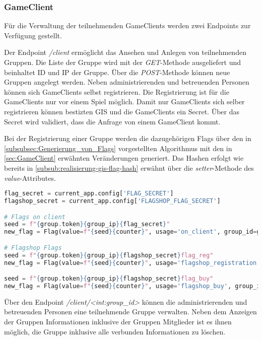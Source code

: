 \subsubsection{GameClient}
Für die Verwaltung der teilnehmenden GameClients werden zwei Endpoints zur Verfügung gestellt.

Der Endpoint \textit{/client} ermöglicht das Ansehen und Anlegen von teilnehmenden Gruppen.
Die Liste der Gruppe wird mit der \textit{GET}-Methode ausgeliefert und beinhaltet ID und IP der Gruppe. Über die \textit{POST}-Methode können neue Gruppen angelegt werden. Neben administrierenden und betreuenden Personen können sich GameClients selbst registrieren. Die Registrierung ist für die GameClients nur vor einem Spiel möglich. Damit nur GameClients sich selber registrieren können bestizten GIS und die GameClients ein Secret. Über das Secret wird validiert, dass die Anfrage von einem GameClient kommt.

Bei der Registrierung einer Gruppe werden die dazugehörigen Flags über den in \autoref{subsubsec:Generierung_von_Flags} vorgestellten Algorithmus mit den in \autoref{sec:GameClient} erwähnten Veränderungen generiert. Das Hashen erfolgt wie bereits in \autoref{subsub:realisierung-gis-flag-hash} erwähnt über die \textit{setter}-Methode des \textit{value}-Attributes.

\begin{lstlisting}[language=Python, frame=single, caption={GIS Flaggenerierung}, captionpos=b, label={lst:gis-flag-gen}]
flag_secret = current_app.config['FLAG_SECRET']
flagshop_secret = current_app.config['FLAGSHOP_FLAG_SECRET']

# Flags on client
seed = f"{group.token}{group_ip}{flag_secret}"
new_flag = Flag(value=f"{seed}{counter}", usage='on_client', group_id=group.id)

# Flagshop Flags
seed = f"{group.token}{group_ip}{flagshop_secret}flag_reg"
new_flag = Flag(value=f"{seed}{counter}", usage='flagshop_registration', group_id=group.id)

seed = f"{group.token}{group_ip}{flagshop_secret}flag_buy"
new_flag = Flag(value=f"{seed}{counter}", usage='flagshop_buy', group_id=group.id)
\end{lstlisting}

Über den Endpoint \textit{/client/<int:group\_id>} können die administrierenden und betreuenden Personen eine teilnehmende Gruppe verwalten. Neben dem Anzeigen der Gruppen Informationen inklusive der Gruppen Mitglieder ist es ihnen möglich, die Gruppe inklusive alle verbunden Informationen zu löschen.

